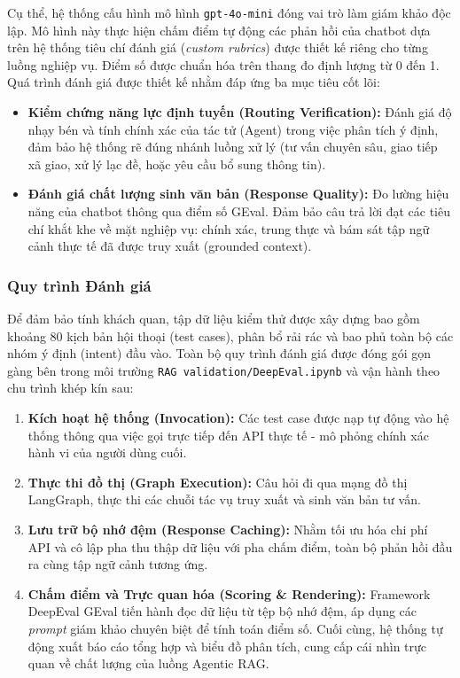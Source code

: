 Cụ thể, hệ thống cấu hình mô hình \texttt{gpt-4o-mini} đóng vai trò làm giám khảo độc lập. Mô hình này thực hiện chấm điểm tự động các phản hồi của chatbot dựa trên hệ thống tiêu chí đánh giá (\textit{custom rubrics}) được thiết kế riêng cho từng luồng nghiệp vụ. Điểm số được chuẩn hóa trên thang đo định lượng từ 0 đến 1. Quá trình đánh giá được thiết kế nhằm đáp ứng ba mục tiêu cốt lõi:

\begin{itemize}
    \item \textbf{Kiểm chứng năng lực định tuyến (Routing Verification):} Đánh giá độ nhạy bén và tính chính xác của tác tử (Agent) trong việc phân tích ý định, đảm bảo hệ thống rẽ đúng nhánh luồng xử lý (tư vấn chuyên sâu, giao tiếp xã giao, xử lý lạc đề, hoặc yêu cầu bổ sung thông tin).
    \item \textbf{Đánh giá chất lượng sinh văn bản (Response Quality):} Đo lường hiệu năng của chatbot thông qua điểm số GEval. Đảm bảo câu trả lời đạt các tiêu chí khắt khe về mặt nghiệp vụ: chính xác, trung thực và bám sát tập ngữ cảnh thực tế đã được truy xuất (grounded context).
\end{itemize}

\subsubsection{Quy trình Đánh giá}

Để đảm bảo tính khách quan, tập dữ liệu kiểm thử được xây dựng bao gồm khoảng 80 kịch bản hội thoại (test cases), phân bổ rải rác và bao phủ toàn bộ các nhóm ý định (intent) đầu vào. Toàn bộ quy trình đánh giá được đóng gói gọn gàng bên trong môi trường \texttt{RAG validation/DeepEval.ipynb} và vận hành theo chu trình khép kín sau:

\begin{enumerate}
    \item \textbf{Kích hoạt hệ thống (Invocation):} Các test case được nạp tự động vào hệ thống thông qua việc gọi trực tiếp đến API thực tế - mô phỏng chính xác hành vi của người dùng cuối.
    
    \item \textbf{Thực thi đồ thị (Graph Execution):} Câu hỏi đi qua mạng đồ thị LangGraph, thực thi các chuỗi tác vụ truy xuất và sinh văn bản tư vấn.
    
    \item \textbf{Lưu trữ bộ nhớ đệm (Response Caching):} Nhằm tối ưu hóa chi phí API và cô lập pha thu thập dữ liệu với pha chấm điểm, toàn bộ phản hồi đầu ra cùng tập ngữ cảnh tương ứng.
    
    \item \textbf{Chấm điểm và Trực quan hóa (Scoring \& Rendering):} Framework DeepEval GEval tiến hành đọc dữ liệu từ tệp bộ nhớ đệm, áp dụng các \textit{prompt} giám khảo chuyên biệt để tính toán điểm số. Cuối cùng, hệ thống tự động xuất báo cáo tổng hợp và biểu đồ phân tích, cung cấp cái nhìn trực quan về chất lượng của luồng Agentic RAG.
\end{enumerate}


